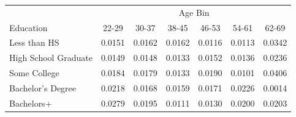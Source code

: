 \begin{tabular}{lcccccc}
\hline\hline
 & \multicolumn{6}{c}{Age Bin} \\
Education & 22-29 & 30-37 & 38-45 & 46-53 & 54-61 & 62-69 \\
\hline
Less than HS&0.0151&0.0162&0.0162&0.0116&0.0113&0.0342\\
High School Graduate&0.0149&0.0148&0.0133&0.0152&0.0136&0.0236\\
Some College&0.0184&0.0179&0.0133&0.0190&0.0101&0.0406\\
Bachelor's Degree&0.0218&0.0168&0.0159&0.0171&0.0226&0.0014\\
Bachelors+&0.0279&0.0195&0.0111&0.0130&0.0200&0.0203\\
\hline\hline
\end{tabular}
